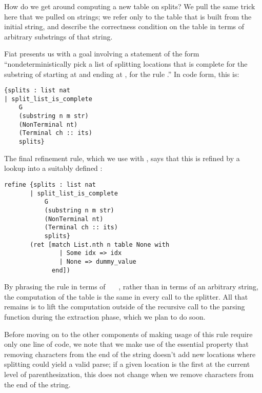       How do we get around computing a new table on splits?  We pull the same trick here that we pulled on strings; we refer only to the table that is built from the initial string, and describe the correctness condition on the table in terms of arbitrary substrings of that string.
      
      Fiat presents us with a goal involving a statement of the form ``nondeterministically pick a list of splitting locations that is complete for the substring of  starting at  and ending at , for the rule .''  In code form, this is:
\begin{verbatim}
{splits : list nat
| split_list_is_complete
    G
    (substring n m str)
    (NonTerminal nt)
    (Terminal ch :: its)
    splits}
\end{verbatim}
    
    The final refinement rule, which we use with , says that this is refined by a lookup into a suitably defined :
\begin{verbatim}
refine {splits : list nat
       | split_list_is_complete
           G
           (substring n m str)
           (NonTerminal nt)
           (Terminal ch :: its)
           splits}
       (ret [match List.nth n table None with
               | Some idx => idx
               | None => dummy_value
             end])
\end{verbatim}

    By phrasing the rule in terms of ~~~, rather than in terms of an arbitrary string, the computation of the table is the same in every call to the splitter.  All that remains is to lift the computation outside of the recursive call to the parsing function during the extraction phase, which we plan to do soon. 
    
    Before moving on to the other components of making usage of this rule require only one line of code, we note that we make use of the essential property that removing characters from the end of the string doesn't add new locations where splitting could yield a valid parse; if a given location is the first \terminal{+} at the current level of parenthesization, this does not change when we remove characters from the end of the string.  
    
